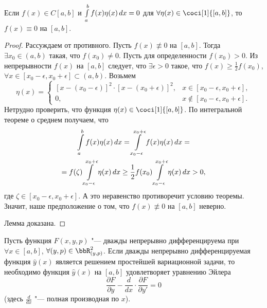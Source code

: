 \begin{lemm} \label{ch29.2lemm1}
Если $f(x)\in C[a,b]$ и $\int_a^b\limits f(x)\eta(x)\,dx=0$ для $\forall\eta(x)\in \coci[1]{[a,b]}$, то $f(x)\equiv 0$ на $[a,b]$.
\end{lemm}
\begin{proof}
Рассуждаем от противного. Пусть $f(x) \not\equiv  0$ на $[a,b]$. Тогда $\exists x_0\in(a,b)$ такая, что $f(x_0)\neq 0$. Пусть для определенности $f(x_0)>0$. Из непрерывности $f(x)$ на $[a,b]$ следует, что $\exists\epsilon>0$ такое, что $f(x)\geq\frac{1}{2}f(x_0)$, $\forall x\in [x_0-\epsilon,x_0+\epsilon]\subset (a,b).$ Возьмем
$$
\eta(x)=\begin{cases} 
[x-(x_0-\epsilon)]^2\cdot [x-(x_0+\epsilon)]^2, &x\in[x_0-\epsilon,x_0+\epsilon],\\
0, &x\notin[x_0-\epsilon,x_0+\epsilon].
\end{cases}
$$
Нетрудно проверить, что функция $\eta(x)\in \coci[1]{[a,b]}$. По интегральной теореме о среднем получаем, что
\begin{multline*}
\int_a^b\limits f(x)\eta(x)\,dx=\int\limits_{x_0-\epsilon}^{x_0+\epsilon} f(x)\eta(x)\,dx =\\= f(\zeta)\int\limits_{x_0-\epsilon}^{x_0+\epsilon}\eta(x)\,dx \geq \frac{1}{2} f(x_0)\int\limits_{x_0-\epsilon}^{x_0+\epsilon}  \eta (x)\,dx>0,
\end{multline*}
где $\zeta\in[x_0-\epsilon,x_0+\epsilon]$. А это неравенство противоречит условию теоремы. Значит, наше предположение о том, что $f(x)\not\equiv  0$ на $[a,b]$ неверно. 

Лемма доказана.
\end{proof}


\begin{thm}\label{ch29thm2}
Пусть функция $F(x,y,p)$ "--- дважды непрерывно дифференцируема при $\forall x\in[a,b]$, $\forall(y,p)\in \bbR^2_{(y,p)}$. Если дважды непрерывно дифференцируемая функция $\hat{y}(x)$ является решением простейшей вариационной задачи, то необходимо функция $\hat{y}(x)$ на $[a,b]$ удовлетворяет уравнению Эйлера
\begin{equation} \label{ch29eq5}
\frac{\partial F}{\partial y}-\frac{d}{dx}\cdot\frac{\partial F}{\partial y'}=0
\end{equation}
(здесь $\frac{d}{dx}$ "--- полная производная по $x$).
\end{thm}

